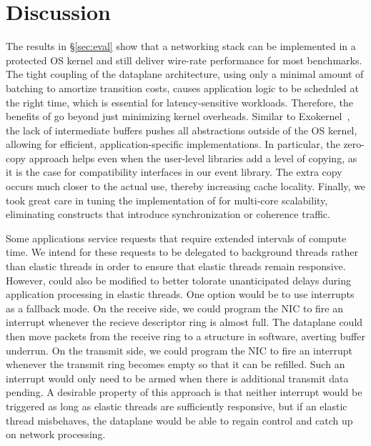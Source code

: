 
\section{Discussion}
\label{sec:disc}


 The results in \S\ref{sec:eval}
show that a networking stack can be implemented in a protected OS
kernel and still deliver wire-rate performance for most benchmarks.
The tight coupling of the dataplane architecture, using only a minimal
amount of batching to amortize transition costs, causes application
logic to be scheduled at the right time, which is essential for
latency-sensitive workloads.  Therefore, the benefits of \ix go beyond
just minimizing kernel overheads. Similar to
Exokernel~\cite{DBLP:conf/sosp/EnglerKO95}, the lack of intermediate
buffers pushes all abstractions outside of the OS kernel, allowing for
efficient, application-specific implementations.  In particular, the
zero-copy approach helps even when the user-level libraries add a
level of copying, as it is the case for compatibility interfaces in
our event library.  The extra copy occurs much closer to the actual
use, thereby increasing cache locality.  Finally, we took great care
in tuning the implementation of \ix for multi-core scalability,
eliminating constructs that introduce synchronization or coherence
traffic.

 Some applications
service requests that require extended intervals of
compute time. We intend for these requests to be delegated
to background threads rather than elastic threads in order
to ensure that elastic threads remain responsive.
However, \ix could also be modified to better tolorate
unanticipated delays during application processing in elastic threads.
One option would be to use interrupts as a fallback mode. On the receive side, we
could program the NIC to fire an interrupt whenever the
recieve descriptor ring is almost full. The dataplane could
then move packets from the receive ring to a structure in software, averting
buffer underrun. On the transmit side, we could program
the NIC to fire an interrupt whenever the transmit ring becomes
empty so that it can be refilled. Such an interrupt would only need
to be armed when there is additional transmit data pending. A desirable
property of this approach is that neither interrupt would
be triggered as long as elastic threads are sufficiently responsive,
but if an elastic thread misbehaves, the \ix dataplane would
be able to regain control and catch up on network processing.


